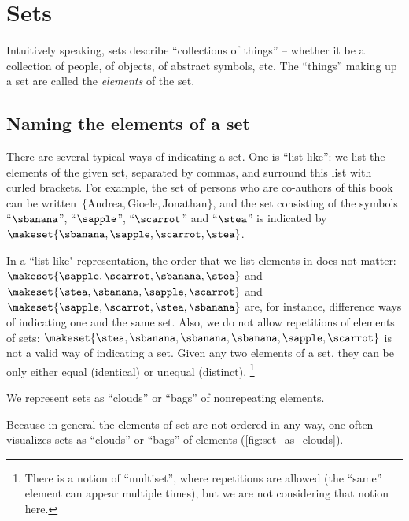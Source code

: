 
\section{Sets}

Intuitively speaking, sets describe ``collections of things'' -- whether it be a collection of people, of objects, of abstract symbols, etc.
The ``things'' making up a set are called the \emph{elements} of the set.

\subsection{Naming the elements of a set}

There are several typical ways of indicating a set.
One is ``list-like'': we list the elements of the given set, separated by commas, and surround this list with curled brackets.
For example, the set of persons who are co-authors of this book can be written~$\{ \text{Andrea}, \text{Gioele}, \text{Jonathan} \}$, and the set consisting of the symbols ``$\sbanana$'', ``$\sapple$'', ``$\scarrot$'' and ``$\stea$'' is indicated by $\makeset{ \sbanana, \sapple, \scarrot, \stea}$.

In a ``list-like" representation, the order that we list elements in does not matter:
$\makeset{ \sapple, \scarrot, \sbanana, \stea}$ and~$\makeset{ \stea, \sbanana, \sapple, \scarrot}$ and~$\makeset{ \sapple, \scarrot, \stea, \sbanana}$ are, for instance, difference ways of indicating one and the same set.
Also, we do not allow repetitions of elements of sets:
$\makeset{ \stea, \sbanana, \sbanana, \sbanana, \sapple, \scarrot }$ is not a valid way of indicating a set.
Given any two elements of a set, they can be only either equal (identical) or unequal (distinct).
\footnote{There is a notion of ``multiset'', where repetitions are allowed (the ``same'' element can appear multiple times), but we are not considering that notion here.}

\begin{marginfigure}
    \centering
    \caption{We represent sets as ``clouds'' or ``bags'' of nonrepeating elements.}
    \label{fig:set_as_clouds}
\end{marginfigure}

Because in general the elements of set are not ordered in any way, one often visualizes sets as ``clouds'' or ``bags'' of elements (\cref{fig:set_as_clouds}).



